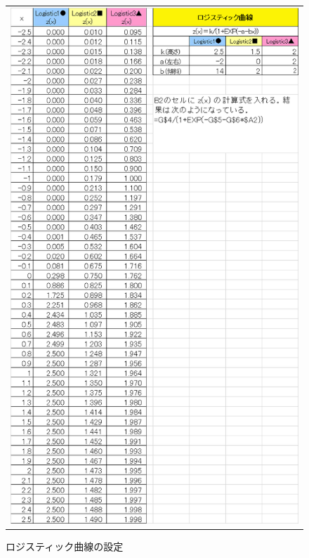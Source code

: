 \documentclass[uplatex, titlepage]{jsarticle}
\begin{document}
\begin{figure}[H]
  \centering
    \begin{tabular}{c}
      \begin{minipage}{0.5\hsize}
        \centering
          \includegraphics[scale = 0.5]{re2/f7.png}
          \caption{ロジスティック曲線の設定}
        \label{fig:table4}
      \end{minipage}
      \begin{minipage}{0.5\hsize}
        \centering

\end{minipage}
\end{tabular}
\end{figure}
\end{document}
